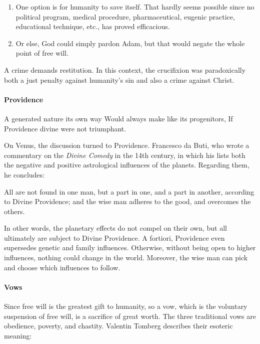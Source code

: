\begin{enumerate}
\item One option is for humanity to save itself. That hardly seems possible since no political program, medical
procedure, pharmaceutical, eugenic practice, educational technique, etc., has proved efficacious. 
\item Or else, God could simply pardon Adam, but that would negate the whole point of free will. 
\end{enumerate}
A crime demands restitution. In this context, the crucifixion was paradoxically both a just penalty against
humanity's sin and also a crime against Christ.

\paragraph{Providence}
\begin{quotex}
A generated nature its own way\newline
Would always make like its progenitors,\newline
If Providence divine were not triumphant. 

\end{quotex}
On Venus, the discussion turned to Providence. Francesco da Buti, who wrote a commentary on the \emph{Divine Comedy} in
the 14th century, in which his lists both the negative and positive astrological influences of the planets. Regarding
them, he concludes:

\begin{quotex}
All are not found in one man, but a part in one, and a part in another, according to Divine Providence; and the wise man
adheres to the good, and overcomes the others. 
\end{quotex}

In other words, the planetary effects do not compel on their own, but all ultimately are subject to Divine Providence. A
fortiori, Providence even supersedes genetic and family influences. Otherwise, without being open to higher influences,
nothing could change in the world. Moreover, the wise man can pick and choose which influences to follow.

\paragraph{Vows}
Since free will is the greatest gift to humanity, so a vow, which is the voluntary suspension of free will, is a
sacrifice of great worth. The three traditional vows are obedience, poverty, and chastity. Valentin Tom\-berg describes
their esoteric meaning:

